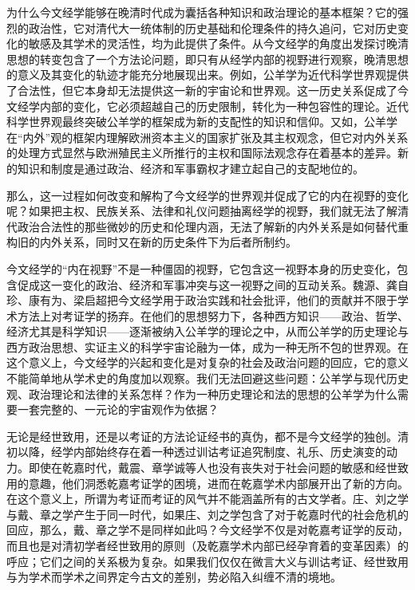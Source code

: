 \documentclass[a4paper, 12pt, openright]{ctexbook}
\begin{document}
为什么今文经学能够在晚清时代成为囊括各种知识和政治理论的基本框架？它的强烈的政治性，它对清代大一统体制的历史基础和伦理条件的持久追问，它对历史变化的敏感及其学术的灵活性，均为此提供了条件。从今文经学的角度出发探讨晚清思想的转变包含了一个方法论问题，即只有从经学内部的视野进行观察，晚清思想的意义及其变化的轨迹才能充分地展现出来。例如，公羊学为近代科学世界观提供了合法性，但它本身却无法提供这一新的宇宙论和世界观。这一历史关系促成了今文经学内部的变化，它必须超越自己的历史限制，转化为一种包容性的理论。近代科学世界观最终突破公羊学的框架成为新的支配性的知识和信仰。又如，公羊学在“内外”观的框架内理解欧洲资本主义的国家扩张及其主权观念，但它对内外关系的处理方式显然与欧洲殖民主义所推行的主权和国际法观念存在着基本的差异。新的知识和制度是通过政治、经济和军事霸权才建立起自己的支配地位的。

那么，这一过程如何改变和解构了今文经学的世界观并促成了它的内在视野的变化呢？如果把主权、民族关系、法律和礼仪问题抽离经学的视野，我们就无法了解清代政治合法性的那些微妙的历史和伦理内涵，无法了解新的内外关系是如何替代重构旧的内外关系，同时又在新的历史条件下为后者所制约。

今文经学的“内在视野”不是一种僵固的视野，它包含这一视野本身的历史变化，包含促成这一变化的政治、经济和军事冲突与这一视野之间的互动关系。魏源、龚自珍、康有为、梁启超把今文经学用于政治实践和社会批评，他们的贡献并不限于学术方法上对考证学的扬弃。在他们的思想努力下，各种西方知识——政治、哲学、经济尤其是科学知识——逐渐被纳入公羊学的理论之中，从而公羊学的历史理论与西方政治思想、实证主义的科学宇宙论融为一体，成为一种无所不包的世界观。在这个意义上，今文经学的兴起和变化是对复杂的社会及政治问题的回应，它的意义不能简单地从学术史的角度加以观察。我们无法回避这些问题：公羊学与现代历史观、政治理论和法律的关系怎样？作为一种历史理论和法的思想的公羊学为什么需要一套完整的、一元论的宇宙观作为依据？

无论是经世致用，还是以考证的方法论证经书的真伪，都不是今文经学的独创。清初以降，经学内部始终存在着一种透过训诂考证追究制度、礼乐、历史演变的动力。即使在乾嘉时代，戴震、章学诚等人也没有丧失对于社会问题的敏感和经世致用的意趣，他们洞悉乾嘉考证学的困境，进而在乾嘉学术内部展开出了新的方向。在这个意义上，所谓为考证而考证的风气并不能涵盖所有的古文学者。庄、刘之学与戴、章之学产生于同一时代，如果庄、刘之学包含了对于乾嘉时代的社会危机的回应，那么，戴、章之学不是同样如此吗？今文经学不仅是对乾嘉考证学的反动，而且也是对清初学者经世致用的原则（及乾嘉学术内部已经孕育着的变革因素）的呼应；它们之间的关系极为复杂。如果我们仅仅在微言大义与训诂考证、经世致用与为学术而学术之间界定今古文的差别，势必陷入纠缠不清的境地。
\end{document}
